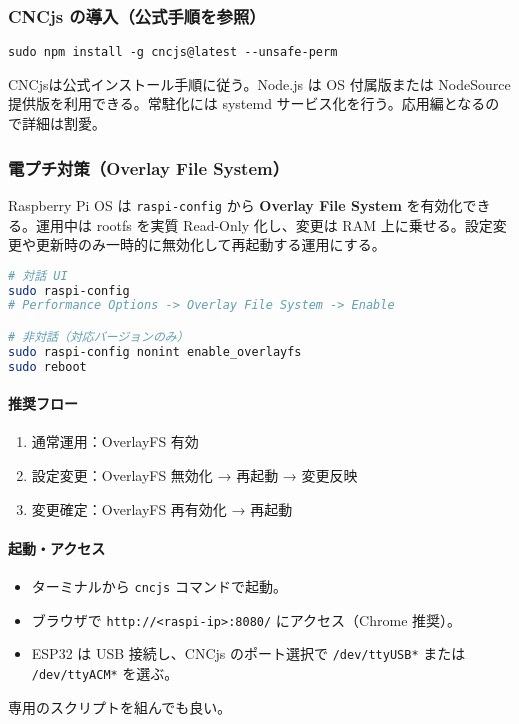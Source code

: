 \documentclass[uplatex,dvipdfmx]{ujarticle}
\begin{document}
\subsubsection*{CNCjs の導入（公式手順を参照）}

\begin{lstlisting}
sudo npm install -g cncjs@latest --unsafe-perm
\end{lstlisting}
CNCjsは公式インストール手順に従う\cite{cncjs-install,cncjs-rpi,cncjs-npm}。Node.js は OS 付属版または NodeSource 提供版を利用できる\cite{nodejs-pkg,nodesource}。常駐化には systemd サービス化を行う\cite{systemd-service}。応用編となるので詳細は割愛｡


\subsubsection*{電プチ対策（Overlay File System）}

Raspberry Pi OS は \texttt{raspi-config} から \textbf{Overlay File System} \cite{rpi-config, rpi-overlay-wp}を有効化できる。運用中は rootfs を実質 Read-Only 化し、変更は RAM 上に乗せる。設定変更や更新時のみ一時的に無効化して再起動する運用にする。

\begin{lstlisting}[caption=OverlayFS の有効化, label=code:overlay, language=bash]
# 対話 UI
sudo raspi-config
# Performance Options -> Overlay File System -> Enable

# 非対話（対応バージョンのみ）
sudo raspi-config nonint enable_overlayfs
sudo reboot
\end{lstlisting}

\paragraph{推奨フロー}
\begin{enumerate}
  \item 通常運用：OverlayFS 有効
  \item 設定変更：OverlayFS 無効化 → 再起動 → 変更反映
  \item 変更確定：OverlayFS 再有効化 → 再起動
\end{enumerate}

\paragraph{起動・アクセス}
\begin{itemize}
  \item ターミナルから \texttt{cncjs} コマンドで起動。
  \item ブラウザで \texttt{http://<raspi-ip>:8080/} にアクセス（Chrome 推奨）。
  \item ESP32 は USB 接続し、CNCjs のポート選択で \texttt{/dev/ttyUSB*} または \texttt{/dev/ttyACM*} を選ぶ。
\end{itemize}
専用のスクリプトを組んでも良い｡
\end{document}
